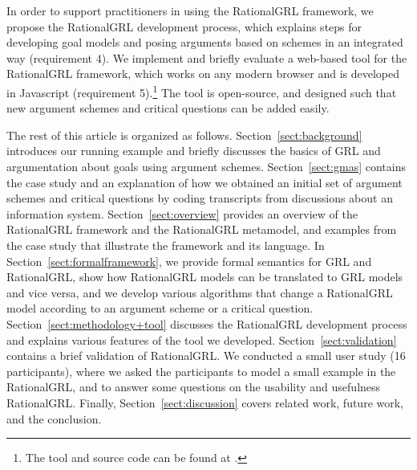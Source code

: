 In order to support practitioners in using the RationalGRL framework, we propose the RationalGRL development process, which explains steps for developing goal models and posing arguments based on schemes in an integrated way (requirement 4). We implement and briefly evaluate a web-based tool for the RationalGRL framework, which works on any modern browser and is developed in Javascript (requirement 5).\footnote{The tool and source code can be found at \rationalgrlurl.} The tool is open-source, and designed such that new argument schemes and critical questions can be added easily.

The rest of this article is organized as follows. Section~\ref{sect:background} introduces our running example and briefly discusses the basics of GRL and argumentation about goals using argument schemes. Section~\ref{sect:gmas} contains the case study and an explanation of how we obtained an initial set of argument schemes and critical questions by coding transcripts from discussions about an information system. Section~\ref{sect:overview} provides an overview of the RationalGRL framework and the RationalGRL metamodel, and examples from the case study that illustrate the framework and its language. In Section~\ref{sect:formalframework}, we provide formal semantics for GRL and RationalGRL, show how RationalGRL models can be translated to GRL models and vice versa, and we develop various algorithms that change a RationalGRL model according to an argument scheme or a critical question. Section~\ref{sect:methodology+tool} discusses the RationalGRL development process and explains various features of the tool we developed. Section~\ref{sect:validation} contains a brief validation of RationalGRL. We conducted a small user study (16 participants), where we asked the participants to model a small example in the RationalGRL, and to answer some questions on the usability and usefulness RationalGRL. Finally, Section~\ref{sect:discussion} covers related work, future work, and the conclusion.
